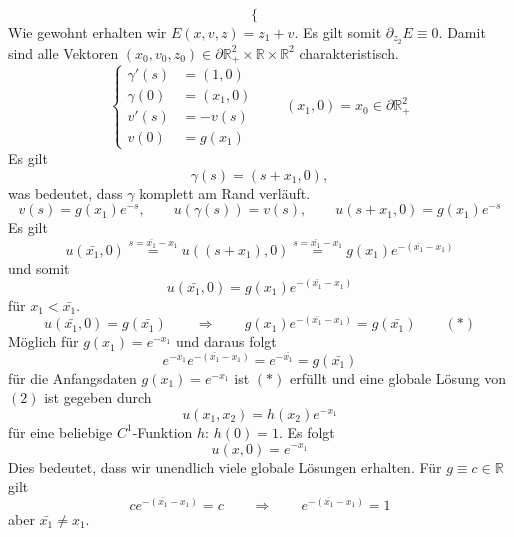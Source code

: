 \begin{beispiele}
\begin{enumerate}[1.]
\[\begin{cases}
			\end{cases}
		\]
		Wie gewohnt erhalten wir $E(x,v,z) = z_1 + v$. Es gilt somit $\partial_{z_2}E \equiv  0$. Damit sind alle Vektoren $(x_0,v_0,z_0) \in \partial \mathbb{R}^2_+ \times \mathbb{R} \times \mathbb{R}^2$ charakteristisch.
		\[
			\begin{cases}
				\gamma'(s) &= (1,0) \\
				\gamma(0) &= (x_1,0) \\
				v'(s) &= -v(s) \\
				v(0) &=g(x_1)
			\end{cases} \qquad (x_1,0)= x_0 \in \partial \mathbb{R}^2_+
		\]
		Es gilt
		\[
			\gamma(s) = (s+ x_1,0),
		\]
		was bedeutet, dass $\gamma$ komplett am Rand verläuft. 
		\[
			v(s) = g(x_1) e^{-s}, \qquad u(\gamma(s)) = v(s), \qquad u(s+x_1,0) = g(x_1) e^{-s}
		\]
		Es gilt
		\[
			u(\bar{x_1},0) \stackrel{s = \bar{x_1}-x_1}{=} u((s+x_1),0) \stackrel{s = \bar{x_1}-x_1}{=} g(x_1)e^{-(\bar{x_1}-x_1)}
		\]
		und somit
		\[
			u(\bar{x_1},0) = g(x_1) e^{-(\bar{x_1}-x_1)} 
		\]
		für $x_1 < \bar{x_1}$. 
		\[
			u(\bar{x_1},0) = g(\bar{x_1}) \qquad \Rightarrow \qquad g(x_1) e^{-(\bar{x_1}-x_1)} = g(\bar{x_1}) \qquad (*)
		\]
		Möglich für $g(x_1) = e^{-x_1}$ und daraus folgt
		\[
			e^{-x_1}e^{-(\bar{x_1}-x_1)} = e^{-\bar{x_1}} = g(\bar{x_1})
		\]
		für die Anfangsdaten $g(x_1) = e^{-x_1}$ ist $(*)$ erfüllt und eine globale Lösung von $(2)$ ist gegeben durch
		\[
			u(x_1,x_2) = h(x_2) e^{-x_1} 
		\]
		für eine beliebige $C^1$-Funktion $h$: $h(0)=1$. Es folgt
		\[
			u(x,0) = e^{-x_1}
		\]
		Dies bedeutet, dass wir unendlich viele globale Lösungen erhalten. Für $g \equiv c \in \mathbb{R}$ gilt	
		\[
			c e^{-(\bar{x_1}-x_1)} = c \qquad \Rightarrow \qquad e^{-(\bar{x_1}-x_1)} =1
		\]
		aber $\bar{x_1} \neq x_1$.
	\end{enumerate}
\end{beispiele}

